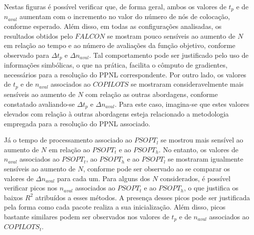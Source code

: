 Nestas figuras é possível verificar que, de forma geral, ambos os valores de $ t_p $ e de $ n_{aval} $ aumentam com o incremento no valor do número de nós de colocação, conforme esperado. Além disso, em todas as configurações analisadas, os resultados obtidos pelo $ FALCON $ se mostram pouco sensíveis ao aumento de $ N $ em relação ao tempo e ao número de avaliações da função objetivo, conforme observado para $ \Delta t_p $ e $ \Delta n_{aval} $. Tal comportamento pode ser justificado pelo uso de informações simbólicas, o que na prática, facilita o cômputo de gradientes, necessários para a resolução do PPNL correspondente. Por outro lado, os valores de $ t_p $ e de $ n_{aval} $ associados ao $ COPILOTS $ se mostraram consideravelmente mais sensíveis ao aumento de $ N $ com relação as outras abordagens, conforme constatado avaliando-se $ \Delta t_p $ e $ \Delta n_{aval} $. Para este caso, imagina-se que estes valores elevados com relação à outras abordagens esteja relacionado a metodologia empregada para a resolução do PPNL associado. 

Já o tempo de processamento associado ao $ PSOPT_l $ se mostrou mais sensível ao aumento de $ N $ em relação ao $ PSOPT_t $ e ao $ PSOPT_h $. No entanto, os valores de $ n_{aval} $ associados ao $ PSOPT_t $, ao $ PSOPT_h $ e ao $ PSOPT_l $ se mostraram igualmente sensíveis ao aumento de $ N $, conforme pode ser observado ao se comparar os valores de $ \Delta n_{aval} $ para cada um. Para alguns dos $ N $ considerados, é possível verificar picos nos $ n_{aval} $ associados ao $ PSOPT_t $ e ao $ PSOPT_h $, o que justifica os baixos $ R^2 $ atribuídos a esses métodos. A presença desses picos pode ser justificada pela forma como cada pacote realiza a sua inicialização. Além disso, picos bastante similares podem ser observados nos valores de $ t_p $ e de $ n_{aval} $ associados ao $ COPILOTS_t $.

